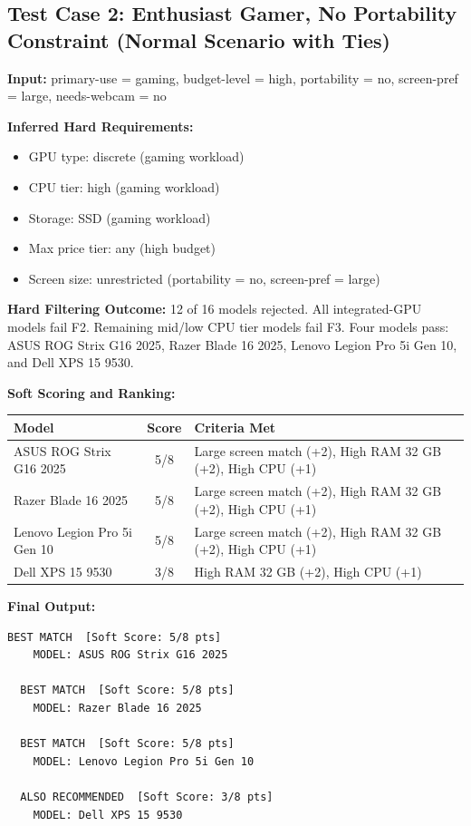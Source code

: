 \documentclass[12pt,a4paper]{article}
\begin{document}
\subsection{Test Case 2: Enthusiast Gamer, No Portability Constraint (Normal Scenario with Ties)}

\textbf{Input:} primary-use = gaming, budget-level = high, portability = no, screen-pref = large, needs-webcam = no

\textbf{Inferred Hard Requirements:}
\begin{itemize}
    \item GPU type: discrete (gaming workload)
    \item CPU tier: high (gaming workload)
    \item Storage: SSD (gaming workload)
    \item Max price tier: any (high budget)
    \item Screen size: unrestricted (portability = no, screen-pref = large)
\end{itemize}

\textbf{Hard Filtering Outcome:} 12 of 16 models rejected. All integrated-GPU models fail F2. Remaining mid/low CPU tier models fail F3. Four models pass: ASUS ROG Strix G16 2025, Razer Blade 16 2025, Lenovo Legion Pro 5i Gen 10, and Dell XPS 15 9530.

\textbf{Soft Scoring and Ranking:}

\begin{center}
\renewcommand{\arraystretch}{1.4}
\begin{tabular}{lcp{6cm}}
\toprule
\textbf{Model} & \textbf{Score} & \textbf{Criteria Met} \\
\midrule
ASUS ROG Strix G16 2025     & 5/8 & Large screen match (+2), High RAM 32 GB (+2), High CPU (+1) \\
Razer Blade 16 2025         & 5/8 & Large screen match (+2), High RAM 32 GB (+2), High CPU (+1) \\
Lenovo Legion Pro 5i Gen 10 & 5/8 & Large screen match (+2), High RAM 32 GB (+2), High CPU (+1) \\
Dell XPS 15 9530            & 3/8 & High RAM 32 GB (+2), High CPU (+1) \\
\bottomrule
\end{tabular}
\end{center}

\textbf{Final Output:}
\begin{lstlisting}[style=output]
  BEST MATCH  [Soft Score: 5/8 pts]
    MODEL: ASUS ROG Strix G16 2025

  BEST MATCH  [Soft Score: 5/8 pts]
    MODEL: Razer Blade 16 2025

  BEST MATCH  [Soft Score: 5/8 pts]
    MODEL: Lenovo Legion Pro 5i Gen 10

  ALSO RECOMMENDED  [Soft Score: 3/8 pts]
    MODEL: Dell XPS 15 9530
\end{lstlisting}
\end{document}
